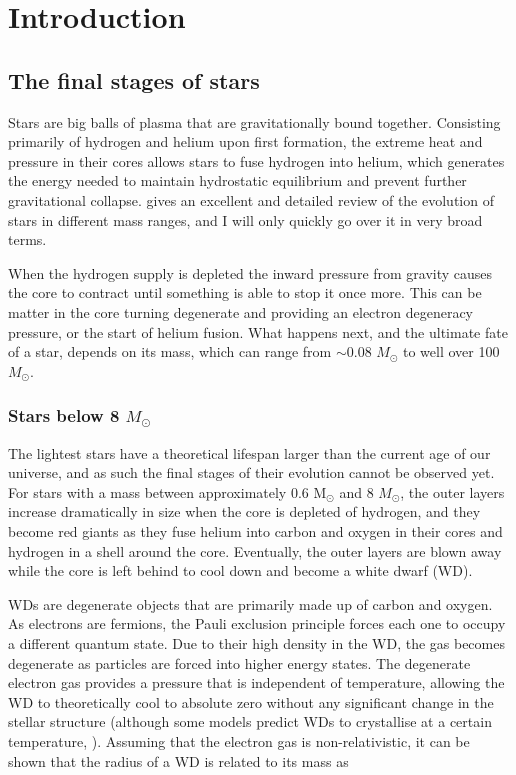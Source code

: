 \documentclass[a4paper,oneside,12pt, class=Latex/Classes/PhDthesisPSnPDF, crop=false]{standalone}
\begin{document}
\doublespacing
\chapter{Introduction}
\label{chap:intro}

\section{The final stages of stars}
Stars are big balls of plasma that are gravitationally bound together. Consisting primarily of hydrogen and helium upon first formation, the extreme heat and pressure in their cores allows stars to fuse hydrogen into helium, which generates the energy needed to maintain hydrostatic equilibrium and prevent further gravitational collapse. \citet{starstruct} gives an excellent and detailed review of the evolution of stars in different mass ranges, and I will only quickly go over it in very broad terms.

When the hydrogen supply is depleted the inward pressure from gravity causes the core to contract until something is able to stop it once more. This can be matter in the core turning degenerate and providing an electron degeneracy pressure, or the start of helium fusion. What happens next, and the ultimate fate of a star, depends on its mass, which can range from $\sim0.08$ $M_\odot$ to well over 100 $M_\odot$.


\subsection{Stars below 8 $M_\odot$}
\label{interm_mass_stars}
The lightest stars have a theoretical lifespan larger than the current age of our universe, and as such the final stages of their evolution cannot be observed yet. For stars with a mass between approximately 0.6 M$_\odot$ and 8 $M_\odot$, the outer layers increase dramatically in size when the core is depleted of hydrogen, and they become red giants as they fuse helium into carbon and oxygen in their cores and hydrogen in a shell around the core. Eventually, the outer layers are blown away while the core is left behind to cool down and become a white dwarf (WD).

WDs are degenerate objects that are primarily made up of carbon and oxygen. As electrons are fermions, the Pauli exclusion principle \citep{Pauli} forces each one to occupy a different quantum state. Due to their high density in the WD, the gas becomes degenerate as particles are forced into higher energy states. The degenerate electron gas provides a pressure that is independent of temperature, allowing the WD to theoretically cool to absolute zero without any significant change in the stellar structure (although some models predict WDs to crystallise at a certain temperature, \citealt{WD_crystal_Mochkovitch, WD_crystal_Isern}). Assuming that the electron gas is non-relativistic, it can be shown that the radius of a WD is related to its mass as
\end{document}
